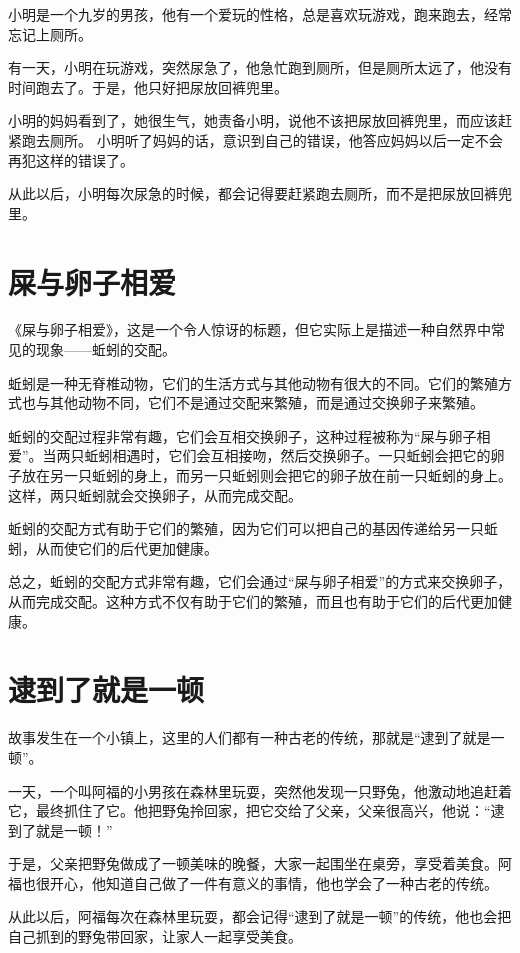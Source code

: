\documentclass[titlepage,oneside]{ctexbook}
\begin{document}
小明是一个九岁的男孩，他有一个爱玩的性格，总是喜欢玩游戏，跑来跑去，经常忘记上厕所。

有一天，小明在玩游戏，突然尿急了，他急忙跑到厕所，但是厕所太远了，他没有时间跑去了。于是，他只好把尿放回裤兜里。

小明的妈妈看到了，她很生气，她责备小明，说他不该把尿放回裤兜里，而应该赶紧跑去厕所。
小明听了妈妈的话，意识到自己的错误，他答应妈妈以后一定不会再犯这样的错误了。

从此以后，小明每次尿急的时候，都会记得要赶紧跑去厕所，而不是把尿放回裤兜里。


\chapter{屎与卵子相爱}

《屎与卵子相爱》，这是一个令人惊讶的标题，但它实际上是描述一种自然界中常见的现象——蚯蚓的交配。

蚯蚓是一种无脊椎动物，它们的生活方式与其他动物有很大的不同。它们的繁殖方式也与其他动物不同，它们不是通过交配来繁殖，而是通过交换卵子来繁殖。

蚯蚓的交配过程非常有趣，它们会互相交换卵子，这种过程被称为“屎与卵子相爱”。当两只蚯蚓相遇时，它们会互相接吻，然后交换卵子。一只蚯蚓会把它的卵子放在另一只蚯蚓的身上，而另一只蚯蚓则会把它的卵子放在前一只蚯蚓的身上。这样，两只蚯蚓就会交换卵子，从而完成交配。

蚯蚓的交配方式有助于它们的繁殖，因为它们可以把自己的基因传递给另一只蚯蚓，从而使它们的后代更加健康。

总之，蚯蚓的交配方式非常有趣，它们会通过“屎与卵子相爱”的方式来交换卵子，从而完成交配。这种方式不仅有助于它们的繁殖，而且也有助于它们的后代更加健康。

\chapter{逮到了就是一顿}

故事发生在一个小镇上，这里的人们都有一种古老的传统，那就是“逮到了就是一顿”。

一天，一个叫阿福的小男孩在森林里玩耍，突然他发现一只野兔，他激动地追赶着它，最终抓住了它。他把野兔拎回家，把它交给了父亲，父亲很高兴，他说：“逮到了就是一顿！”

于是，父亲把野兔做成了一顿美味的晚餐，大家一起围坐在桌旁，享受着美食。阿福也很开心，他知道自己做了一件有意义的事情，他也学会了一种古老的传统。

从此以后，阿福每次在森林里玩耍，都会记得“逮到了就是一顿”的传统，他也会把自己抓到的野兔带回家，让家人一起享受美食。
\end{document}

